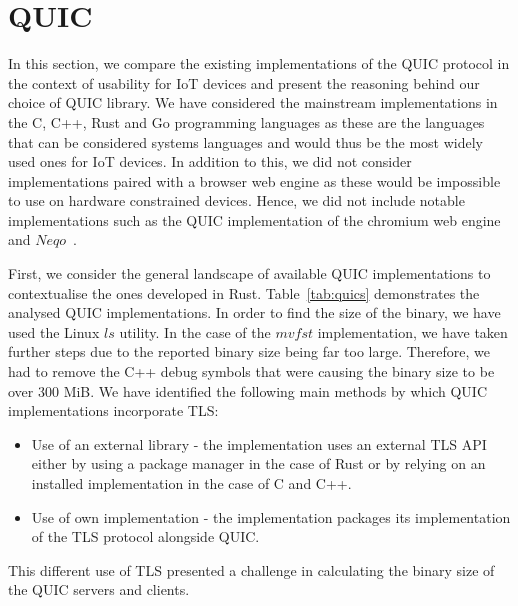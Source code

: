 \section{QUIC} \label{section:quic_impl}

In this section, we compare the existing implementations of the QUIC protocol in the context of usability for IoT devices and present the reasoning behind our choice of QUIC library.
We have considered the mainstream implementations in the C, C++, Rust and Go programming languages as these are the languages that can be considered systems languages and would thus be the most widely used ones for IoT devices.
In addition to this, we did not consider implementations paired with a browser web engine as these would be impossible to use on hardware constrained devices.
Hence, we did not include notable implementations such as the QUIC implementation of the chromium web engine~\citep{chromium_quic_2021} and $Neqo$~\citep{mozilla_neqo_2022}.

First, we consider the general landscape of available QUIC implementations to contextualise the ones developed in Rust.
Table~\ref{tab:quics} demonstrates the analysed QUIC implementations.
In order to find the size of the binary, we have used the Linux $ls$ utility.
In the case of the $mvfst$ implementation, we have taken further steps due to the reported binary size being far too large.
Therefore, we had to remove the C++ debug symbols that were causing the binary size to be over 300 MiB.
We have identified the following main methods by which QUIC implementations incorporate TLS:

\begin{itemize}
    \item Use of an external library - the implementation uses an external TLS API either by using a package manager in the case of Rust or by relying on an installed implementation in the case of C and C++.
    \item Use of own implementation - the implementation packages its implementation of the TLS protocol alongside QUIC.
\end{itemize}

This different use of TLS presented a challenge in calculating the binary size of the QUIC servers and clients.

